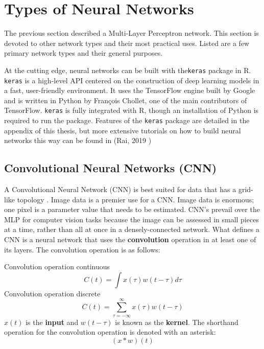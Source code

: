 
\section{Types of Neural Networks} %

The previous section described a Multi-Layer Perceptron network. This
section is devoted to other network types and their most practical uses. Listed are a few primary network types and their general purposes.

At the cutting edge, neural networks can be built with the\texttt{keras} package in R. \texttt{keras} is a high-level API centered
on the construction of deep learning models in a fast, user-friendly environment. \cite{tensorflow2015-whitepaper} It uses the TensorFlow engine built by Google and
is written in Python by François Chollet, one of the main contributors of TensorFlow. \texttt{keras} is fully integrated with
R, though an installation of Python is required to run the package. Features of the \texttt{keras} package are detailed in the appendix of this thesis, but more extensive tutorials on how to build neural networks this way can be found in (Rai, 2019 \cite{rai})


\hypertarget{convolutional-neural-networks-cnn}{%
\subsection{Convolutional Neural Networks
(CNN)}\label{convolutional-neural-networks-cnn}}

A Convolutional Neural Network (CNN) is best suited for data that has a grid-like topology \cite{Goodfellow-et-al-2016}.  Image data is a premier use for a CNN.  Image data is enormous; one pixel is a parameter value that needs to be estimated. CNN's prevail over the MLP for computer vision tasks because the image can be assessed in small pieces at a time, rather than all at once in a densely-connected network.  What defines a CNN is a neural network that uses the \textbf{convolution} operation in at least one of its layers.  The convolution operation is as follows:

Convolution operation continuous \[
C(t) = \int x(\tau)w(t - \tau)d\tau
\] Convolution operation discrete \[
C(t) = \sum_{\tau = -\infty}^\infty x(\tau)w(t - \tau)
\] \(x(t)\) is the \textbf{input} and \(w(t-\tau)\) is known as the
\textbf{kernel}. The shorthand operation for the convolution operation
is denoted with an asterisk: \[
(x * w)(t)
\]

